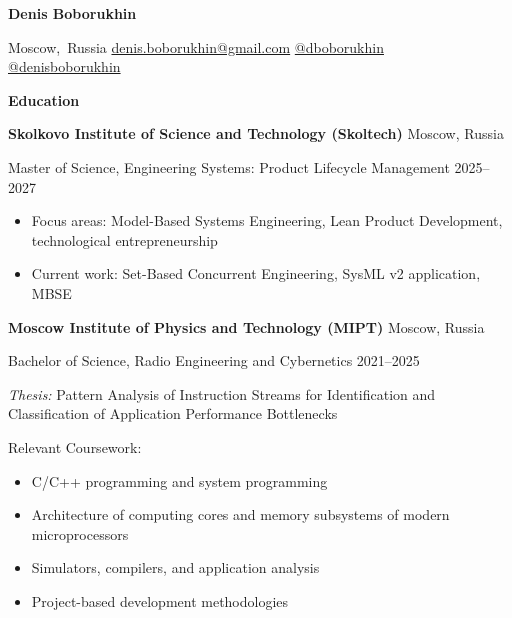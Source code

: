 \documentclass[11pt]{article}
\begin{document}
\begin{center}
    \textbf{\Large Denis Boborukhin}\\ 
    \hrulefill
\end{center}

\newcommand{\infofield}[2]{\mbox{{\normalsize #1}\hspace{0.5em}#2}}
\newcommand{\email}[1]{\infofield{\faEnvelope}{\href{mailto:#1}{#1}}}
\newcommand{\location}[1]{\infofield{\faMapMarker}{#1}}
\newcommand{\github}[2]{\infofield{\faGithub}{\href{#2}{#1}}}
\newcommand{\telegram}[2]{\infofield{\faSend}{\href{#2}{#1}}}

\begin{center}
    \location{Moscow, Russia}
    \email{denis.boborukhin@gmail.com}
    \telegram{@dboborukhin}{https://t.me/dboborukhin} \\
    \github{@denisboborukhin}{https://github.com/denisboborukhin}
\end{center}

\begin{center}
    \textbf{Education}
\end{center}

\textbf{Skolkovo Institute of Science and Technology (Skoltech)} \hfill Moscow, Russia

Master of Science, Engineering Systems: Product Lifecycle Management \hfill 2025--2027
\begin{itemize}[noitemsep, topsep=0pt, partopsep=0pt, parsep=0pt]
    \item Focus areas: Model-Based Systems Engineering, Lean Product Development, technological entrepreneurship
    \item Current work: Set-Based Concurrent Engineering, SysML v2 application, MBSE
\end{itemize}

\vspace{12pt}

\textbf{Moscow Institute of Physics and Technology (MIPT)} \hfill Moscow, Russia

Bachelor of Science, Radio Engineering and Cybernetics \hfill 2021--2025

\textit{Thesis:} Pattern Analysis of Instruction Streams for Identification and Classification of Application Performance Bottlenecks

\vspace{6pt}

Relevant Coursework:
\begin{itemize}[noitemsep, topsep=0pt, partopsep=0pt, parsep=0pt]
    \item C/C++ programming and system programming
    \item Architecture of computing cores and memory subsystems of modern microprocessors
    \item Simulators, compilers, and application analysis
    \item Project-based development methodologies
\end{itemize}
\end{document}
